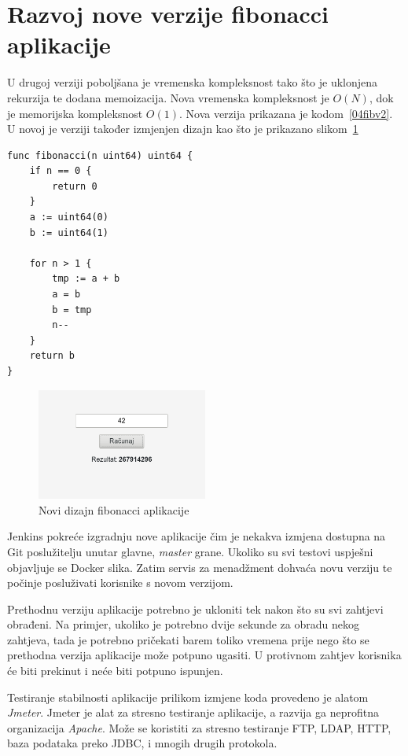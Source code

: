 \section{Razvoj nove verzije fibonacci aplikacije}
U drugoj verziji poboljšana je vremenska kompleksnost tako što je uklonjena rekurzija te dodana
memoizacija. Nova vremenska kompleksnost je $O(N)$, dok je memorijska kompleksnost $O(1)$. Nova
verzija prikazana je kodom~\ref{04fibv2}. U novoj je verziji također izmjenjen dizajn kao što je
prikazano slikom~\ref{fig:04redesign}

\begin{lstlisting}[float=h]
func fibonacci(n uint64) uint64 {
	if n == 0 {
		return 0
	}
	a := uint64(0)
	b := uint64(1)

	for n > 1 {
		tmp := a + b
		a = b
		b = tmp
		n--
	}
	return b
}
\end{lstlisting}

\begin{figure}[h]
    \centering
    \includegraphics[width=0.5\textwidth]{img/04/new_app.png}
    \caption{Novi dizajn fibonacci aplikacije}%
    \label{fig:04redesign}
\end{figure}

Jenkins pokreće izgradnju nove aplikacije čim je nekakva izmjena dostupna na Git poslužitelju unutar
glavne, \textit{master} grane. Ukoliko su svi testovi uspješni objavljuje se Docker slika. Zatim
servis za menadžment dohvaća novu verziju te počinje posluživati korisnike s novom verzijom.

Prethodnu verziju aplikacije potrebno je ukloniti tek nakon što su svi zahtjevi obrađeni. Na
primjer, ukoliko je potrebno dvije sekunde za obradu nekog zahtjeva, tada je potrebno pričekati
barem toliko vremena prije nego što se prethodna verzija aplikacije može potpuno ugasiti.  U
protivnom zahtjev korisnika će biti prekinut i neće biti potpuno ispunjen.

Testiranje stabilnosti aplikacije prilikom izmjene koda provedeno je alatom \textit{Jmeter}. Jmeter
je alat za stresno testiranje aplikacije, a razvija ga neprofitna organizacija \textit{Apache}. Može
se koristiti za stresno testiranje FTP, LDAP, HTTP, baza podataka preko JDBC, i mnogih drugih
protokola.

